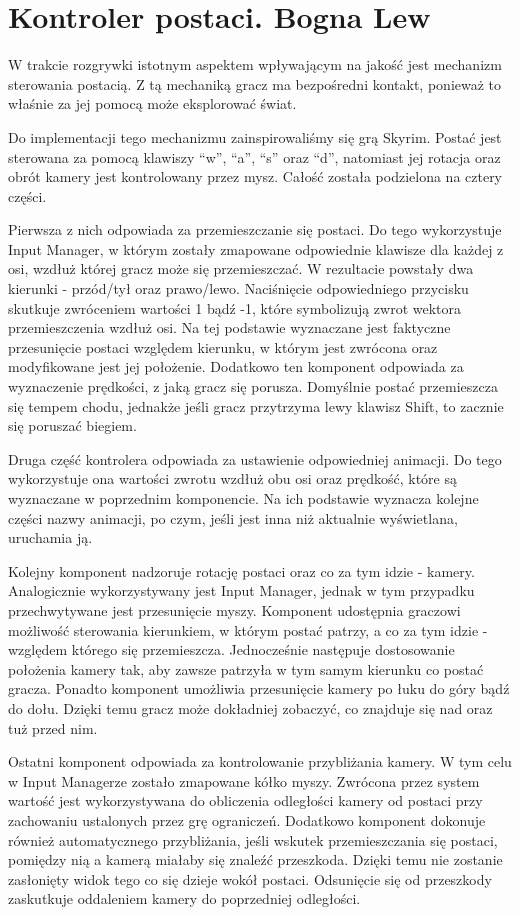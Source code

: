 \section{Kontroler postaci. Bogna Lew}

W trakcie rozgrywki istotnym aspektem wpływającym na jakość jest mechanizm sterowania postacią. Z tą mechaniką gracz ma
bezpośredni kontakt, ponieważ to właśnie za jej pomocą może eksplorować świat.

Do implementacji tego mechanizmu zainspirowaliśmy się grą Skyrim. Postać jest sterowana za pomocą klawiszy “w”, “a”, “s”
oraz “d”, natomiast jej rotacja oraz obrót kamery jest kontrolowany przez mysz. Całość została podzielona na cztery
części.

Pierwsza z nich odpowiada za przemieszczanie się postaci. Do tego wykorzystuje Input Manager, w którym zostały
zmapowane odpowiednie klawisze dla każdej z osi, wzdłuż której gracz może się przemieszczać. W rezultacie powstały dwa
kierunki - przód/tył oraz prawo/lewo. Naciśnięcie odpowiedniego przycisku skutkuje zwróceniem wartości 1 bądź -1, które
symbolizują zwrot wektora przemieszczenia wzdłuż osi. Na tej podstawie wyznaczane jest faktyczne przesunięcie postaci
względem kierunku, w którym jest zwrócona oraz modyfikowane jest jej położenie. Dodatkowo ten komponent odpowiada za
wyznaczenie prędkości, z jaką gracz się porusza. Domyślnie postać przemieszcza się tempem chodu, jednakże jeśli gracz
przytrzyma lewy klawisz Shift, to zacznie się poruszać biegiem.

Druga część kontrolera odpowiada za ustawienie odpowiedniej animacji. Do tego wykorzystuje ona wartości zwrotu wzdłuż
obu osi oraz prędkość, które są wyznaczane w poprzednim komponencie. Na ich podstawie wyznacza kolejne części nazwy
animacji, po czym, jeśli jest inna niż aktualnie wyświetlana, uruchamia ją.

Kolejny komponent nadzoruje rotację postaci oraz co za tym idzie - kamery. Analogicznie wykorzystywany jest Input
Manager, jednak w tym przypadku przechwytywane jest przesunięcie myszy. Komponent udostępnia graczowi możliwość
sterowania kierunkiem, w którym postać patrzy, a co za tym idzie - względem którego się przemieszcza. Jednocześnie
następuje dostosowanie położenia kamery tak, aby zawsze patrzyła w tym samym kierunku co postać gracza. Ponadto
komponent umożliwia przesunięcie kamery po łuku do góry bądź do dołu. Dzięki temu gracz może dokładniej zobaczyć,
co znajduje się nad oraz tuż przed nim.

Ostatni komponent odpowiada za kontrolowanie przybliżania kamery. W tym celu w Input Managerze zostało zmapowane kółko
myszy. Zwrócona przez system wartość jest wykorzystywana do obliczenia odległości kamery od postaci przy zachowaniu
ustalonych przez grę ograniczeń. Dodatkowo komponent dokonuje również automatycznego przybliżania, jeśli wskutek
przemieszczania się postaci, pomiędzy nią a kamerą miałaby się znaleźć przeszkoda. Dzięki temu nie zostanie zasłonięty
widok tego co się dzieje wokół postaci. Odsunięcie się od przeszkody zaskutkuje oddaleniem kamery do poprzedniej
odległości.
